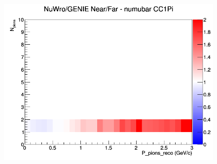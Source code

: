 \documentclass[12pt]{article}
\begin{document}
\begin{figure}[h]
\endminipage
{}
\includegraphics[width=\linewidth]{eff_N_P/GAr/pions/ratios/CC1Pi_NuWro_GENIE_numubar_NF_N_P.png}
\endminipage
\newline
\end{figure}
\clearpage
\end{document}
